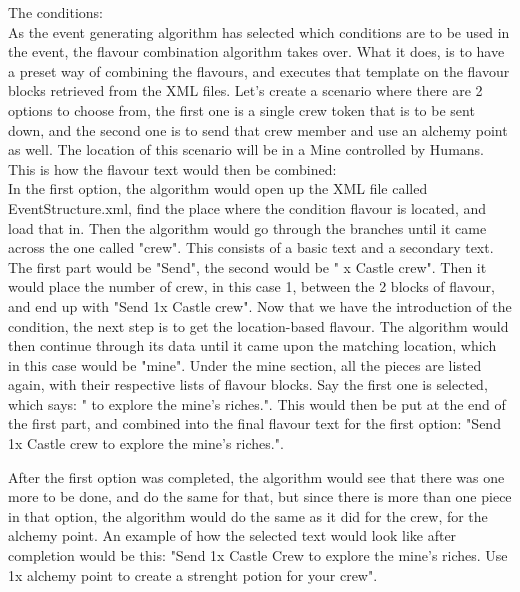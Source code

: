 The conditions:\\
As the event generating algorithm has selected which conditions are to be used in the event, the flavour combination algorithm takes over. What it does, is to have a preset way of combining the flavours, and executes that template on the flavour blocks retrieved from the XML files. Let's create a scenario where there are 2 options to choose from, the first one is a single crew  token that is to be sent down, and the second one is to send that crew member and use an alchemy point as well. The location of this scenario will be in a Mine controlled by Humans.
This is how the flavour text would then be combined:\\
In the first option, the algorithm would open up the XML file called EventStructure.xml, find the place where the condition flavour is located, and load that in. Then the algorithm would go through the branches until it came across the one called "crew". This consists of a basic text and a secondary text. The first part would be "Send", the second would be " x Castle crew". Then it would place the number of crew, in this case 1, between the 2 blocks of flavour, and end up with "Send 1x Castle crew".
Now that we have the introduction of the condition, the next step is to get the location-based flavour. The algorithm would then continue through its data until it came upon the matching location, which in this case would be "mine". Under the mine section, all the pieces are listed again, with their respective lists of flavour blocks. Say the first one is selected, which says: " to explore the mine's riches.". This would then be put at the end of the first part, and combined into the final flavour text for the first option: "Send 1x Castle crew to explore the mine's riches.".

After the first option was completed, the algorithm would see that there was one more to be done, and do the same for that, but since there is more than one piece in that option, the algorithm would do the same as it did for the crew, for the alchemy point.
An example of how the selected text would look like after completion would be this: "Send 1x Castle Crew to explore the mine's riches. Use 1x alchemy point to create a strenght potion for your crew".\\


